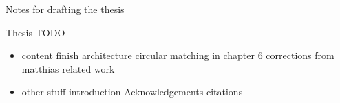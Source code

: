 \clearemptydoublepage

{}

\begin{center}
	\huge{Notes for drafting the thesis}
\end{center}


Thesis TODO
\begin{itemize}
\item content
\subitem finish architecture
\subitem circular matching in chapter 6
\subitem corrections from matthias
\subitem related work
\item other stuff
\subitem introduction
\subitem Acknowledgements
\subitem citations
\end{itemize}
